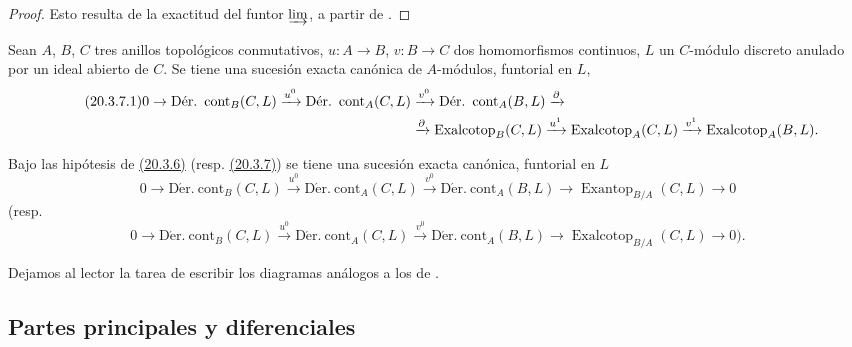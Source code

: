 \begin{proof}
Esto resulta de la exactitud del funtor $\varinjlim$, a partir de
.
\end{proof}

\begin{corollary}[20.3.7]
\label{0.20.3.7-fr}
Sean $A$, $B$, $C$ tres anillos topológicos conmutativos, $u:A\to B$,
$v:B\to C$ dos homomorfismos continuos, $L$ un $C$-módulo discreto anulado
por un ideal abierto de $C$. Se tiene una sucesión exacta canónica de $A$-módulos,
funtorial en $L$,
\begin{align}
\tag{20.3.7.1}
\label{0.20.3.7.1-fr}
  0\to\operatorname{D\acute{e}r.\ cont}_B(C,L)\xrightarrow{u^0}
  \operatorname{D\acute{e}r.\ cont}_A(C,L)&\xrightarrow{v^0}
  \operatorname{D\acute{e}r.\ cont}_A(B,L)\xrightarrow{\partial} \\
  &\xrightarrow{\partial}\operatorname{Exalcotop}_B(C,L)\xrightarrow{u^1}
  \operatorname{Exalcotop}_A(C,L)\xrightarrow{v^1}
  \operatorname{Exalcotop}_A(B,L). \notag
\end{align}
\end{corollary}

\begin{corollary}[20.3.8]
\label{0.20.3.8-fr}
Bajo las hipótesis de \hyperref[0.20.3.5-fr]{\textup{(20.3.6)}} \textup{(resp.
\hyperref[0.20.3.6-fr]{\textup{(20.3.7)}})} se tiene una sucesión exacta canónica, funtorial en $L$
\begin{equation}
\tag{20.3.8.1}
\label{0.20.3.8.1-fr}
  0\to\operatorname{D\acute{e}r.\ cont}_B(C,L)\xrightarrow{u^0}
  \operatorname{D\acute{e}r.\ cont}_A(C,L)\xrightarrow{v^0}
  \operatorname{D\acute{e}r.\ cont}_A(B,L)\to
  \operatorname{Exantop}_{B/A}(C,L)\to0
\end{equation}
\textup{(resp.}
\begin{equation}
\tag{20.3.8.2}
\label{0.20.3.8.2-fr}
  0\to\operatorname{D\acute{e}r.\ cont}_B(C,L)\xrightarrow{u^0}
  \operatorname{D\acute{e}r.\ cont}_A(C,L)\xrightarrow{v^0}
  \operatorname{D\acute{e}r.\ cont}_A(B,L)\to
  \operatorname{Exalcotop}_{B/A}(C,L)\to0\text{).}
\end{equation}
\end{corollary}

Dejamos al lector la tarea de escribir los diagramas análogos a los de
.

\subsection{Partes principales y diferenciales}
\label{subsection:0.20.4-fr}

